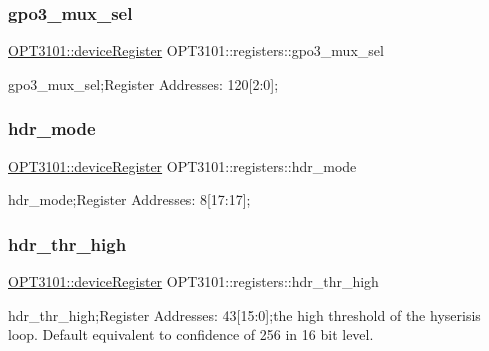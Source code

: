 \subsubsection{\texorpdfstring{gpo3\+\_\+mux\+\_\+sel}{gpo3\_mux\_sel}}
{\footnotesize\ttfamily \mbox{\hyperlink{class_o_p_t3101_1_1device_register}{O\+P\+T3101\+::device\+Register}} O\+P\+T3101\+::registers\+::gpo3\+\_\+mux\+\_\+sel}



gpo3\+\_\+mux\+\_\+sel;Register Addresses\+: 120\mbox{[}2\+:0\mbox{]}; 

\mbox{\label{class_o_p_t3101_1_1registers_a78e8bc6ad4a84c7d19974ba6c58e329e}} 
\subsubsection{\texorpdfstring{hdr\+\_\+mode}{hdr\_mode}}
{\footnotesize\ttfamily \mbox{\hyperlink{class_o_p_t3101_1_1device_register}{O\+P\+T3101\+::device\+Register}} O\+P\+T3101\+::registers\+::hdr\+\_\+mode}



hdr\+\_\+mode;Register Addresses\+: 8\mbox{[}17\+:17\mbox{]}; 

\mbox{\label{class_o_p_t3101_1_1registers_a9f703a5eeb8b45b076487ee38f56c38b}} 
\subsubsection{\texorpdfstring{hdr\+\_\+thr\+\_\+high}{hdr\_thr\_high}}
{\footnotesize\ttfamily \mbox{\hyperlink{class_o_p_t3101_1_1device_register}{O\+P\+T3101\+::device\+Register}} O\+P\+T3101\+::registers\+::hdr\+\_\+thr\+\_\+high}



hdr\+\_\+thr\+\_\+high;Register Addresses\+: 43\mbox{[}15\+:0\mbox{]};the high threshold of the hyserisis loop. Default equivalent to confidence of 256 in 16 bit level. 

\mbox{\label{class_o_p_t3101_1_1registers_a440d873648ba4fe03c3690e18953610d}} 
